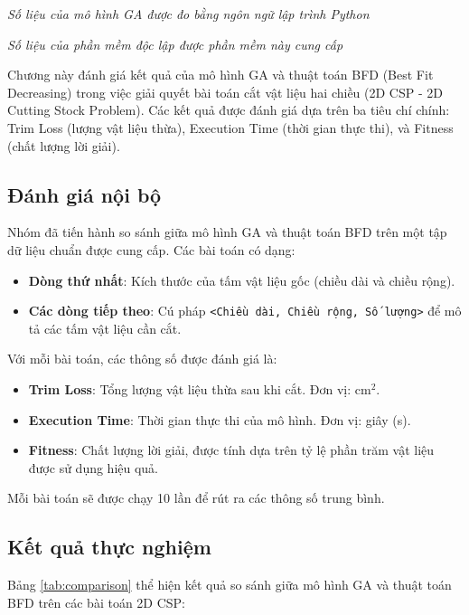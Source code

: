 \documentclass[a4paper]{article}
\begin{document}
\textit{Số liệu của mô hình GA được đo bằng ngôn ngữ lập trình Python}

\textit{Số liệu của phần mềm độc lập được phần mềm này cung cấp}

\hspace{11pt}
Chương này đánh giá kết quả của mô hình GA và thuật toán BFD (Best Fit Decreasing) trong việc giải quyết bài toán cắt vật liệu hai chiều (2D CSP - 2D Cutting Stock Problem). Các kết quả được đánh giá dựa trên ba tiêu chí chính: Trim Loss (lượng vật liệu thừa), Execution Time (thời gian thực thi), và Fitness (chất lượng lời giải).

\subsection{Đánh giá nội bộ}

Nhóm đã tiến hành so sánh giữa mô hình GA và thuật toán BFD trên một tập dữ liệu chuẩn được cung cấp. Các bài toán có dạng:

\begin{itemize}
    \item \textbf{Dòng thứ nhất}: Kích thước của tấm vật liệu gốc (chiều dài và chiều rộng).
    \item \textbf{Các dòng tiếp theo}: Cú pháp \texttt{<Chiều dài, Chiều rộng, Số lượng>} để mô tả các tấm vật liệu cần cắt.
\end{itemize}

Với mỗi bài toán, các thông số được đánh giá là:

\begin{itemize}
    \item \textbf{Trim Loss}: Tổng lượng vật liệu thừa sau khi cắt. Đơn vị: cm$^2$.
    \item \textbf{Execution Time}: Thời gian thực thi của mô hình. Đơn vị: giây (s).
    \item \textbf{Fitness}: Chất lượng lời giải, được tính dựa trên tỷ lệ phần trăm vật liệu được sử dụng hiệu quả.
\end{itemize}

Mỗi bài toán sẽ được chạy 10 lần để rút ra các thông số trung bình.

\subsection{Kết quả thực nghiệm}

Bảng \ref{tab:comparison} thể hiện kết quả so sánh giữa mô hình GA và thuật toán BFD trên các bài toán 2D CSP:
\end{document}
